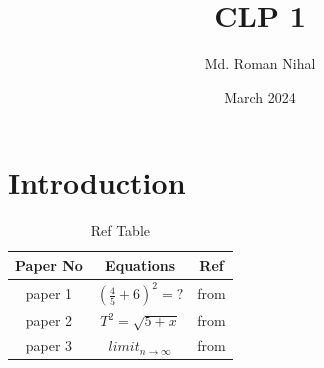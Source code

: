 \documentclass{article}
\title{CLP 1}
\author{Md. Roman Nihal}
\date{March 2024}
\begin{document}
\maketitle
\listoftables

\section{Introduction}
\begin{table}[ht]
    \centering
    \begin{tabular}{|c|c|c|}
    \hline
       \textbf{Paper No} & \textbf{Equations} & \textbf{Ref}\\\hline
       paper 1 & $\left(\frac{4}{5}+6\right)^2=?$ & from\cite{el2015machine}\\\hline
       paper 2 & $T^2=\sqrt{5+x}$ & from\cite{jordan2015machine}\\\hline
       paper 3 & $limit_{n\to\infty}$ & from\cite{mitchell1990machine}\\\hline
    \end{tabular}
    \caption{Ref Table}
    \label{tab:my_label}
\end{table}

\printbibliography
%
%
\end{document}
